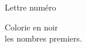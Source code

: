 \begin{minipage}{0.20\textwidth}
    \begin{center}
        Lettre numéro \numero 
    \end{center}
    
    \begin{center}
        Colorie en noir\\ les nombres premiers.
    \end{center}
\end{minipage}
\hfill\vrule
\hfill
\begin{minipage}{0.75\textwidth}
    
\end{minipage}